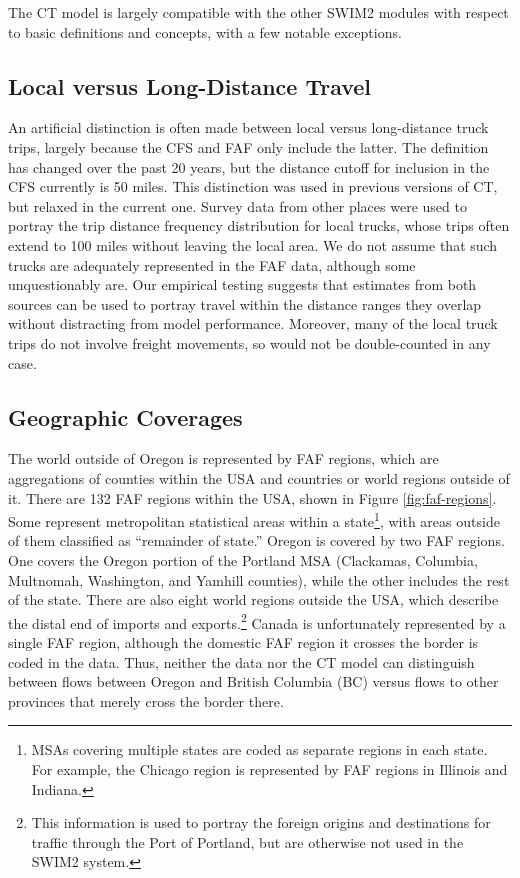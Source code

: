 The CT model is largely compatible with the other SWIM2 modules with respect to basic definitions and concepts, with a few notable exceptions.

\subsection{Local versus Long-Distance Travel}
An artificial distinction is often made between local versus long-distance truck trips, largely because the CFS and FAF only include the latter. The definition has changed over the past 20 years, but the distance cutoff for inclusion in the CFS currently is 50 miles. This distinction was used in previous versions of CT, but relaxed in the current one. Survey data from other places were used to portray the trip distance frequency distribution for local trucks, whose trips often extend to 100 miles without leaving the local area. We do not assume that such trucks are adequately represented in the FAF data, although some unquestionably are. Our empirical testing suggests that estimates from both sources can be used to portray travel within the distance ranges they overlap without distracting from model performance. Moreover, many of the local truck trips do not involve freight movements, so would not be double-counted in any case.

\subsection{Geographic Coverages}\label{sec:ct-geographic-coverages}

The world outside of Oregon is represented by FAF regions, which are aggregations of counties within the USA and countries or world regions outside of it. There are 132 FAF regions within the USA, shown in Figure \ref{fig:faf-regions}. Some represent metropolitan statistical areas within a state\footnote{MSAs covering multiple states are coded as separate regions in each state. For example, the Chicago region is represented by FAF regions in Illinois and Indiana.}, with areas outside of them classified as ``remainder of state.'' Oregon is covered by two FAF regions. One covers the Oregon portion of the Portland MSA (Clackamas, Columbia, Multnomah, Washington, and Yamhill counties), while the other includes the rest of the state. There are also eight world regions outside the USA, which describe the distal end of imports and exports.\footnote{This information is used to portray the foreign origins and destinations for traffic through the Port of Portland, but are otherwise not used in the SWIM2 system.} Canada is unfortunately represented by a single FAF region, although the domestic FAF region it crosses the border is coded in the data. Thus, neither the data nor the CT model can distinguish between flows between Oregon and British Columbia (BC) versus flows to other provinces that merely cross the border there.

